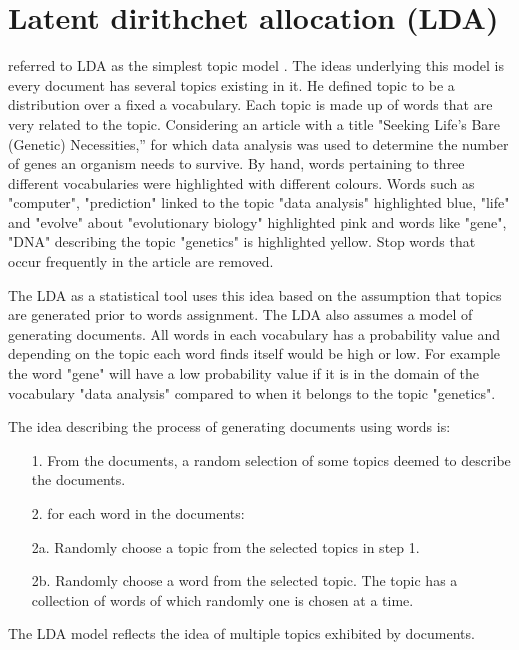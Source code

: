 \section{ Latent dirithchet allocation (LDA)}
\begin{flushleft}
\cite{blei2012surveying} referred to LDA as the simplest topic model . The ideas underlying this model is every document has several topics existing in it. He defined topic to be a distribution over a fixed a vocabulary.
Each topic is made up of words that are very related to the topic. Considering an article with a title "Seeking Life’s Bare (Genetic) Necessities,” for which data analysis was used to determine the number of genes an organism needs to survive. By hand, words pertaining to three different vocabularies were highlighted with different colours. Words such as "computer", "prediction" linked to the topic "data analysis" highlighted blue, "life" and "evolve" about "evolutionary biology" highlighted pink and words like "gene", "DNA" describing the topic "genetics" is highlighted yellow.
Stop words that occur frequently in the article are removed. 
\end{flushleft}

The LDA as a statistical tool uses this idea based on the assumption that topics are generated prior to words assignment. The LDA also assumes a model of generating documents. All words in each vocabulary has a probability value and depending on the topic each word finds itself would be high or low. For example the word "gene" will have a low probability value if it is in the domain of the  vocabulary "data analysis" compared to when it belongs to the topic "genetics". 

The idea describing the process of generating documents using words is:
\begin{itemize}
\item[1.] From the documents, a random selection of some topics deemed to describe the documents.
\item[2.] for each word in the documents:
		\item[2a.]Randomly choose a topic from
the selected topics in step 1.
		\item[2b.]Randomly choose a word from the selected topic. The topic has a collection of words of which randomly one is chosen at a time. 
\end{itemize}
The LDA model reflects the idea of multiple topics exhibited by documents.

